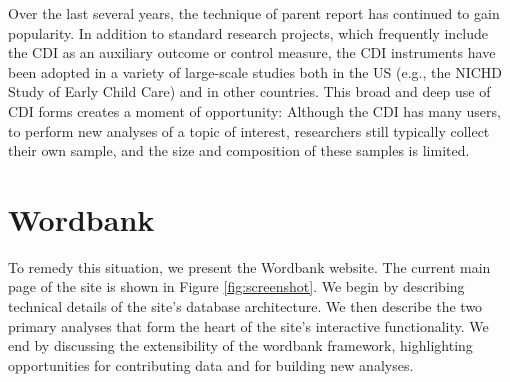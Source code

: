 \documentclass[man,noapacite]{apa2}
\begin{document}


Over the last several years, the technique of parent report has continued to gain popularity. In addition to standard research projects, which frequently include the CDI as an auxiliary outcome or control measure, the CDI instruments have been adopted in a variety of large-scale studies both in the US (e.g., the NICHD Study of Early Child Care) and in other countries. This broad and deep use of CDI forms creates a moment of opportunity: Although the CDI has many users, to perform new analyses of a topic of interest, researchers still typically collect their own sample, and the size and composition of these samples is limited. 

\section{Wordbank}

To remedy this situation, we present the Wordbank website. The current main page of the site is shown in Figure \ref{fig:screenshot}. We begin by describing technical details of the site's database architecture. We then describe the two primary analyses that form the heart of the site's interactive functionality. We end by discussing the extensibility of the wordbank framework, highlighting opportunities for contributing data and for building new analyses. 
\end{document}
